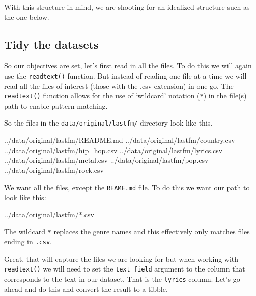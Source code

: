 \documentclass[
  letterpaper,
  DIV=11,
  numbers=noendperiod]{scrreport}
\newenvironment{Shaded}{\begin{snugshade}}{\end{snugshade}}
\newcommand{\ExtensionTok}[1]{\textcolor[rgb]{0.00,0.00,0.00}{#1}}
\theoremstyle{definition}
\theoremstyle{remark}
\begin{document}
With this structure in mind, we are shooting for an idealized structure
such as the one below.

\begin{table}

\end{table}

\hypertarget{tidy-the-datasets}{%
\subsection{Tidy the datasets}\label{tidy-the-datasets}}

So our objectives are set, let's first read in all the files. To do this
we will again use the \texttt{readtext()} function. But instead of
reading one file at a time we will read all the files of interest (those
with the .csv extension) in one go. The \texttt{readtext()} function
allows for the use of `wildcard' notation (\texttt{*}) in the file(s)
path to enable pattern matching.

So the files in the \texttt{data/original/lastfm/} directory look like
this.

\begin{Shaded}
\begin{Highlighting}[]
\ExtensionTok{../data/original/lastfm/README.md}
\ExtensionTok{../data/original/lastfm/country.csv}
\ExtensionTok{../data/original/lastfm/hip\_hop.csv}
\ExtensionTok{../data/original/lastfm/lyrics.csv}
\ExtensionTok{../data/original/lastfm/metal.csv}
\ExtensionTok{../data/original/lastfm/pop.csv}
\ExtensionTok{../data/original/lastfm/rock.csv}
\end{Highlighting}
\end{Shaded}

We want all the files, except the \texttt{REAME.md} file. To do this we
want our path to look like this:

\begin{Shaded}
\begin{Highlighting}[]
\ExtensionTok{../data/original/lastfm/*.csv}
\end{Highlighting}
\end{Shaded}

The wildcard \texttt{*} replaces the genre names and this effectively
only matches files ending in \texttt{.csv}.

Great, that will capture the files we are looking for but when working
with \texttt{readtext()} we will need to set the \texttt{text\_field}
argument to the column that corresponds to the text in our dataset. That
is the \texttt{lyrics} column. Let's go ahead and do this and convert
the result to a tibble.
\end{document}
